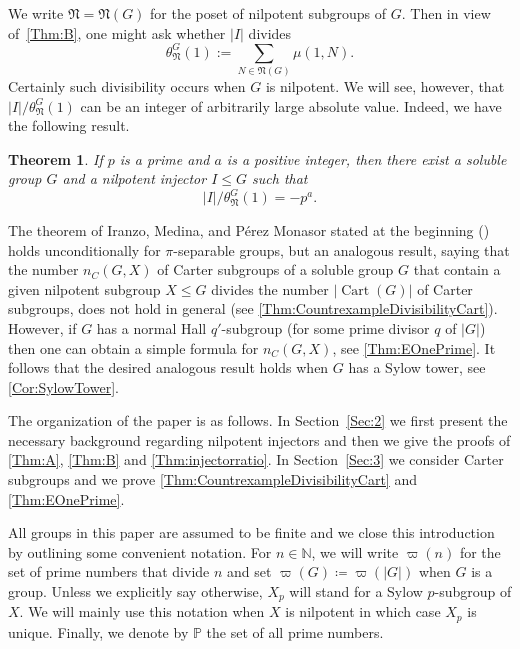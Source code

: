 \documentclass[a4paper,12pt,reqno]{amsart}
\newtheorem{prevtheorem}{Theorem}
\numberwithin{equation}{section}
\DeclareMathOperator{\cart}{Cart}
\newcommand{\card}[1]{\left\lvert{#1}\right\rvert}
\renewcommand{\leq}{\leqslant}
\def\NN{{\mathfrak N}}
\def\NS{\theta_\NN^G(1)}
\begin{document}
We write $\NN= \NN(G)$ for the poset of nilpotent subgroups of $G$. Then in view  of~\autoref{Thm:B}, one might ask whether $|I|$ divides 
$$
\NS:=\sum_{N \in \NN(G)}\mu(1,N).
$$  
Certainly such divisibility occurs when $G$ is nilpotent.  We will see, however, that $|I|/\NS$ can be an integer of arbitrarily large absolute value.  Indeed, we have the following result.

\begin{prevtheorem}\label{Thm:injectorratio}
If $p$ is a prime and $a$ is a positive integer, 
then there exist a soluble group $G$ 
and a nilpotent injector $I \leq G$ 
such that
\[
|I|/\NS=-p^a.
\]
\end{prevtheorem}





The theorem of Iranzo, Medina, and P\'{e}rez Monasor stated at the beginning (\cite[Theorem 0.1]{arithmetical_questions}) holds unconditionally for $\pi$-separable groups, but an analogous result, saying that the number $n_C(G,X)$ of Carter subgroups of a soluble group $G$ that contain a given nilpotent subgroup $X \leq G$ divides the number $\card{\cart(G)}$ of Carter subgroups, does not hold in general (see \autoref{Thm:CountrexampleDivisibilityCart}).  
However, if $G$ has a normal Hall $q'$-subgroup (for some prime divisor $q$ of $|G|$) then one can obtain a simple formula for $n_C(G,X)$, see \autoref{Thm:EOnePrime}.  It follows that the desired analogous result holds when $G$ has a Sylow tower, see \autoref{Cor:SylowTower}.  



The organization of the paper is as follows. In Section~\ref{Sec:2} we first present the necessary background regarding nilpotent injectors and then we give the proofs of \autoref{Thm:A}, \autoref{Thm:B} and \autoref{Thm:injectorratio}. In Section~\ref{Sec:3} we consider Carter subgroups and we prove \autoref{Thm:CountrexampleDivisibilityCart} and \autoref{Thm:EOnePrime}.


All groups in this paper are assumed to be finite and we close this introduction by outlining some convenient notation.  For $n \in \mathbb{N}$, we will write $\varpi(n)$
for the set of prime numbers that divide $n$
and set $\varpi(G) \coloneqq \varpi(|G|)$ when $G$ is a group.
Unless we explicitly say otherwise, 
$X_p$ will stand for a Sylow $p$-subgroup of $X$. 
We will mainly use this notation when $X$ is nilpotent 
in which case $X_p$ is unique. Finally, we denote by $\mathbb{P}$ the set of all prime numbers.
\end{document}
